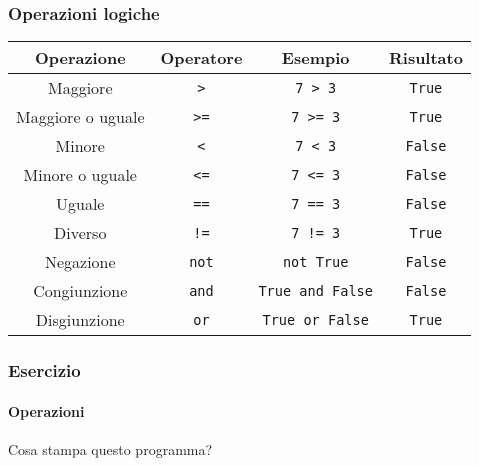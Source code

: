 \begin{contentframe}
    \frametitle{Operazioni logiche}

    \centering
    \begin{tabular}{c|c|c|c}
        Operazione                      & Operatore     & Esempio                   & Risultato         \\
        \midrule
        \midrule
        Maggiore                        & \texttt{>}    & \texttt{7 > 3}            & \texttt{True}     \\
        Maggiore o uguale               & \texttt{>=}   & \texttt{7 >= 3}           & \texttt{True}     \\
        Minore                          & \texttt{<}    & \texttt{7 < 3}            & \texttt{False}    \\
        Minore o uguale                 & \texttt{<=}   & \texttt{7 <= 3}           & \texttt{False}    \\
        Uguale                          & \texttt{==}   & \texttt{7 == 3}           & \texttt{False}    \\
        Diverso                         & \texttt{!=}   & \texttt{7 != 3}           & \texttt{True}     \\
        \midrule
        Negazione                       & \texttt{not}  & \texttt{not True}         & \texttt{False}    \\
        Congiunzione                    & \texttt{and}  & \texttt{True and False}   & \texttt{False}    \\
        Disgiunzione                    & \texttt{or}   & \texttt{True or False}    & \texttt{True}     \\
    \end{tabular}
\end{contentframe}

\begin{exerciseframe}
    \frametitle{Esercizio}
    \framesubtitle{Operazioni}

    Cosa stampa questo programma?

    \bigskip
\end{exerciseframe}


